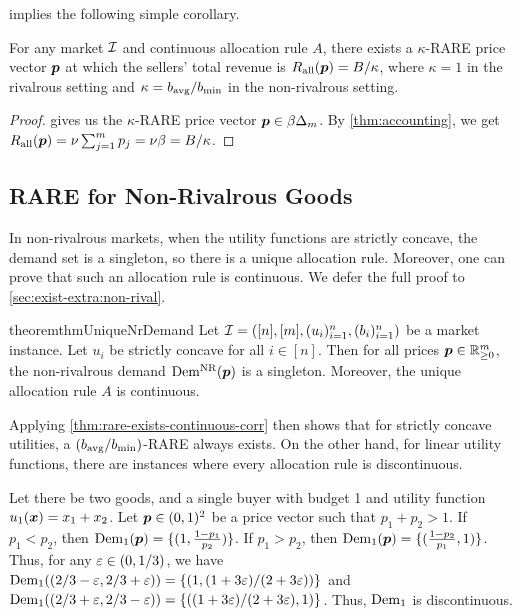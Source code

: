  implies the following simple corollary.

\begin{corollary}
\label{thm:rare-exists-continuous-corr}
For any market $\mathcal{I}$ and continuous allocation rule $A$,
there exists a $\kappa$-RARE price vector $\bm{p}$
at which the sellers' total revenue is $R_{\operatorname{all}}(\bm{p}) = B/\kappa$,
where $\kappa = 1$ in the rivalrous setting and
$\kappa = b_{\operatorname{avg}}/b_{\min}$ in the non-rivalrous setting.
\end{corollary}
\begin{proof}
 gives us the $\kappa$-RARE price vector $\bm{p} \in \beta\Delta_m$.
By \cref{thm:accounting}, we get $R_{\operatorname{all}}(\bm{p}) = \nu\sum_{j=1}^m p_j = \nu\beta = B/\kappa$.
\end{proof}

\subsection{RARE for Non-Rivalrous Goods}
\label{sec:exist:non-rival}

In non-rivalrous markets, when the utility functions are strictly concave,
the demand set is a singleton, so there is a unique allocation rule.
Moreover, one can prove that such an allocation rule is continuous.
We defer the full proof to \cref{sec:exist-extra:non-rival}.

\begin{restatable}{theorem}{thmUniqueNrDemand}
\label{thm:unique-nr-demand}
Let $\mathcal{I} = ([n], [m], (u_i)_{i=1}^n, (b_i)_{i=1}^n)$ be a market instance.
Let $u_i$ be strictly concave for all $i \in [n]$.
Then for all prices $\bm{p} \in \mathbb{R}_{\ge 0}^m$,
the non-rivalrous demand $\operatorname{Dem^{\mathrm{NR}}}(\bm{p})$ is a singleton.
Moreover, the unique allocation rule $A$ is continuous.
\end{restatable}

Applying \cref{thm:rare-exists-continuous-corr} then shows that for strictly
concave utilities, a $(b_{\operatorname{avg}}/b_{\min})$-RARE always exists.
On the other hand, for linear utility functions,
there are instances where every allocation rule is discontinuous.

\begin{example}
\label{ex:lin-util-dem-discont}
Let there be two goods,
and a single buyer with budget 1 and utility function $u_1(\bm{x}) = x_1 + x_2$.
Let $\bm{p} \in (0, 1)^2$ be a price vector such that $p_1 + p_2 > 1$.
If $p_1 < p_2$, then $\operatorname{Dem}_1(\bm{p}) = \{(1, \frac{1-p_1}{p_2})\}$.
If $p_1 > p_2$, then $\operatorname{Dem}_1(\bm{p}) = \{(\frac{1-p_2}{p_1}, 1)\}$.
Thus, for any $\varepsilon \in (0, 1/3)$, we have $\operatorname{Dem}_1((2/3-\varepsilon, 2/3+\varepsilon)) = \{(1, (1+3\varepsilon)/(2+3\varepsilon))\}$
and $\operatorname{Dem}_1((2/3+\varepsilon, 2/3-\varepsilon)) = \{((1+3\varepsilon)/(2+3\varepsilon), 1)\}$.
Thus, $\operatorname{Dem}_1$ is discontinuous.
\end{example}

